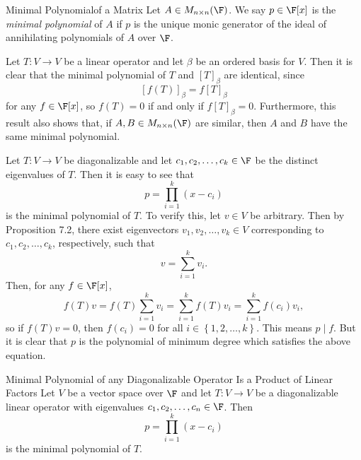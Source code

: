 \documentclass[linearalgebra]{subfiles}
\begin{document}
    \begin{definition}{Minimal Polynomial}{of a Matrix}
        Let $A\in M_{n\times n}(\F)$. We say $p\in\F[x]$ is the \emph{minimal polynomial} of $A$ if $p$ is the unique monic generator of the ideal of annihilating polynomials of $A$ over $\F$.
    \end{definition}

    \begin{remark}
        Let $T:V\to V$ be a linear operator and let $\beta$ be an ordered basis for $V$. Then it is clear that the minimal polynomial of $T$ and $\left[ T \right] _\beta$ are identical, since
        \begin{equation*}
            \left[ f(T) \right] _\beta = f\left[ T \right] _\beta
        \end{equation*}
        for any $f\in\F[x]$, so $f(T)=0$ if and only if $f\left[ T \right] _\beta=0$. Furthermore, this result also shows that, if $A, B\in M_{n\times n}(\F)$ are similar, then $A$ and $B$ have the same minimal polynomial. 
    \end{remark}

    \begin{remark}
        Let $T:V\to V$ be diagonalizable and let $c_1,c_2,\ldots,c_k\in\F$ be the distinct eigenvalues of $T$. Then it is easy to see that
        \begin{equation*}
            p = \prod^{k}_{i=1} \left( x-c_i \right) 
        \end{equation*}
        is the minimal polynomial of $T$. To verify this, let $v\in V$ be arbitrary. Then by Proposition 7.2, there exist eigenvectors $v_1,v_2,\ldots,v_k\in V$ corresponding to $c_1,c_2,\ldots,c_k$, respectively, such that
        \begin{equation*}
            v = \sum^{k}_{i=1} v_i.
        \end{equation*}
        Then, for any $f\in\F[x]$,
        \begin{equation*}
            f(T)v = f(T)\sum^{k}_{i=1} v_i = \sum^{k}_{i=1} f(T)v_i = \sum^{k}_{i=1} f\left( c_i \right) v_i,
        \end{equation*}
        so if $f(T)v = 0$, then $f\left( c_i \right) =0$ for all $i\in\left\lbrace 1,2,\ldots,k \right\rbrace$. This means $p\mid f$. But it is clear that $p$ is the polynomial of minimum degree which satisfies the above equation.
    \end{remark}

    \begin{prop}{Minimal Polynomial of any Diagonalizable Operator Is a Product of Linear Factors}
        Let $V$ be a vector space over $\F$ and let $T:V\to V$ be a diagonalizable linear operator with eigenvalues $c_1, c_2, \ldots, c_n\in \F$. Then
        \begin{equation*}
            p = \prod^{k}_{i=1} \left( x-c_i \right) 
        \end{equation*}
        is the minimal polynomial of $T$.
    \end{prop}
\end{document}
